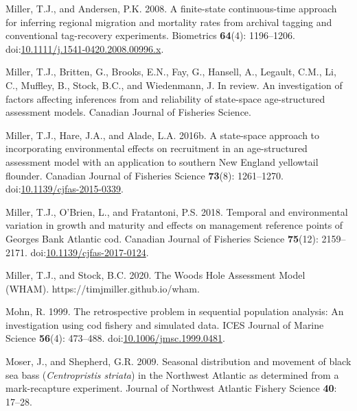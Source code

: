 \documentclass[
]{article}
\newlength{\cslhangindent}
\newlength{\cslentryspacingunit} %
\newenvironment{CSLReferences}[2] %
 {%
  \setlength{\parindent}{0pt}
  \ifodd #1
  \let\oldpar\par
  \def\par{\hangindent=\cslhangindent\oldpar}
  \fi
  \setlength{\parskip}{#2\cslentryspacingunit}
 }%
 {}
\begin{document}
\begin{CSLReferences}{1}{0}
\leavevmode{}%
Miller, T.J., and Andersen, P.K. 2008. A finite-state continuous-time approach for inferring regional migration and mortality rates from archival tagging and conventional tag-recovery experiments. Biometrics \textbf{64}(4): 1196--1206. doi:\href{https://doi.org/10.1111/j.1541-0420.2008.00996.x}{10.1111/j.1541-0420.2008.00996.x}.

\leavevmode{}%
Miller, T.J., Britten, G., Brooks, E.N., Fay, G., Hansell, A., Legault, C.M., Li, C., Muffley, B., Stock, B.C., and Wiedenmann, J. In review. An investigation of factors affecting inferences from and
reliability of state-space age-structured assessment models. Canadian Journal of Fisheries Science.

\leavevmode{}%
Miller, T.J., Hare, J.A., and Alade, L.A. 2016b. A state-space approach to incorporating environmental effects on recruitment in an age-structured assessment model with an application to southern {New England} yellowtail flounder. Canadian Journal of Fisheries Science \textbf{73}(8): 1261--1270. doi:\href{https://doi.org/10.1139/cjfas-2015-0339}{10.1139/cjfas-2015-0339}.

\leavevmode{}%
Miller, T.J., O'Brien, L., and Fratantoni, P.S. 2018. Temporal and environmental variation in growth and maturity and effects on management reference points of {Georges Bank Atlantic} cod. Canadian Journal of Fisheries Science \textbf{75}(12): 2159--2171. doi:\href{https://doi.org/10.1139/cjfas-2017-0124}{10.1139/cjfas-2017-0124}.

\leavevmode{}%
Miller, T.J., and Stock, B.C. 2020. The {Woods Hole Assessment Model} ({WHAM}). https://timjmiller.github.io/wham.

\leavevmode{}%
Mohn, R. 1999. The retrospective problem in sequential population analysis: An investigation using cod fishery and simulated data. ICES Journal of Marine Science \textbf{56}(4): 473--488. doi:\href{https://doi.org/10.1006/jmsc.1999.0481}{10.1006/jmsc.1999.0481}.

\leavevmode{}%
Moser, J., and Shepherd, G.R. 2009. Seasonal distribution and movement of black sea bass (\emph{{C}entropristis striata}) in the {N}orthwest {A}tlantic as determined from a mark-recapture experiment. Journal of Northwest Atlantic Fishery Science \textbf{40}: 17--28.


\end{CSLReferences}
\end{document}
